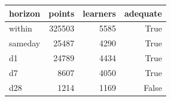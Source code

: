 \begin{tabular}{lrrr}
\toprule
horizon & points & learners & adequate \\
\midrule
within & 325503 & 5585 & True \\
sameday & 25487 & 4290 & True \\
d1 & 24789 & 4434 & True \\
d7 & 8607 & 4050 & True \\
d28 & 1214 & 1169 & False \\
\bottomrule
\end{tabular}
